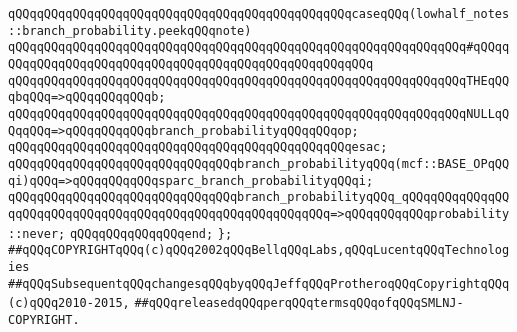 \verb|qQQqqQQqqQQqqQQqqQQqqQQqqQQqqQQqqQQqqQQqqQQqqQQqcaseqQQq(lowhalf_notes::branch_probability.peekqQQqnote)|\newline
\verb|qQQqqQQqqQQqqQQqqQQqqQQqqQQqqQQqqQQqqQQqqQQqqQQqqQQqqQQqqQQqqQQq#qQQqqQQqqQQqqQQqqQQqqQQqqQQqqQQqqQQqqQQqqQQqqQQqqQQqqQQq|\newline
\verb|qQQqqQQqqQQqqQQqqQQqqQQqqQQqqQQqqQQqqQQqqQQqqQQqqQQqqQQqqQQqqQQqTHEqQQqbqQQq=>qQQqqQQqqQQqb;|\newline
\verb|qQQqqQQqqQQqqQQqqQQqqQQqqQQqqQQqqQQqqQQqqQQqqQQqqQQqqQQqqQQqqQQqNULLqQQqqQQq=>qQQqqQQqqQQqbranch_probabilityqQQqqQQqop;|\newline
\verb|qQQqqQQqqQQqqQQqqQQqqQQqqQQqqQQqqQQqqQQqqQQqqQQqesac;|\newline
\newline
\verb|qQQqqQQqqQQqqQQqqQQqqQQqqQQqqQQqbranch_probabilityqQQq(mcf::BASE_OPqQQqi)qQQq=>qQQqqQQqqQQqsparc_branch_probabilityqQQqi;|\newline
\verb|qQQqqQQqqQQqqQQqqQQqqQQqqQQqqQQqbranch_probabilityqQQq_qQQqqQQqqQQqqQQqqQQqqQQqqQQqqQQqqQQqqQQqqQQqqQQqqQQqqQQqqQQq=>qQQqqQQqqQQqprobability::never;|\newline
\verb|qQQqqQQqqQQqqQQqend;|\newline
\newline
\verb|};|\newline
\newline
\newline
\verb|##qQQqCOPYRIGHTqQQq(c)qQQq2002qQQqBellqQQqLabs,qQQqLucentqQQqTechnologies|\newline
\verb|##qQQqSubsequentqQQqchangesqQQqbyqQQqJeffqQQqProtheroqQQqCopyrightqQQq(c)qQQq2010-2015,|\newline
\verb|##qQQqreleasedqQQqperqQQqtermsqQQqofqQQqSMLNJ-COPYRIGHT.|\newline

